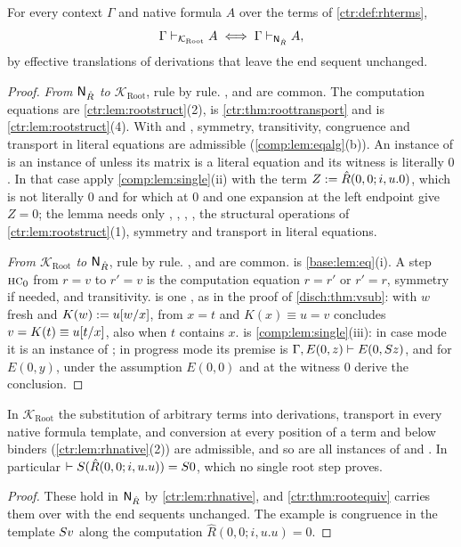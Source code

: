 \begin{theorem}\label{ctr:thm:rootequiv}
For every context $\Gamma$ and native formula $A$ over the terms of \cref{ctr:def:rhterms},
\[
 \Gamma\vdash_{\mathcal K_{\mathrm{Root}}}A\iff\Gamma\vdash_{\mathsf{N}_{\hat R}}A,
\]
by effective translations of derivations that leave the end sequent unchanged.
\end{theorem}
\begin{proof}
\emph{From $\mathsf{N}_{\hat R}$ to $\mathcal K_{\mathrm{Root}}$}, rule by rule. ,
 and  are common. The computation equations are
\cref{ctr:lem:rootstruct}(2),  is \cref{ctr:thm:roottransport} and
 is \cref{ctr:lem:rootstruct}(4). With  and ,
symmetry, transitivity, congruence and transport in literal equations are admissible
(\cref{comp:lem:eqalg}(b)). An instance of  is an instance of 
unless its matrix is a literal equation and its witness is literally $0$. In that case apply
\cref{comp:lem:single}(ii) with the term $Z\mathrel{:=}\hat R(0,0;i,u.0)$, which is not literally $0$
and for which  at $0$ and one expansion at the left endpoint give $Z=0$; the
lemma needs only , , , , the structural
operations of \cref{ctr:lem:rootstruct}(1), symmetry and transport in literal equations.

\emph{From $\mathcal K_{\mathrm{Root}}$ to $\mathsf{N}_{\hat R}$}, rule by rule. ,
 and  are common.  is \cref{base:lem:eq}(i). A step
$\rulename{HC}_0$ from $r=v$ to $r'=v$ is the computation equation $r=r'$ or $r'=r$, symmetry if
needed, and transitivity.  is one , as in the proof of
\cref{disch:thm:vsub}: with $w$ fresh and $K(w)\mathrel{:=} u[w/x]$,  from $x=t$
and $K(x)\equiv u=v$ concludes $v=K(t)\equiv u[t/x]$, also when $t$ contains $x$.
 is \cref{comp:lem:single}(iii): in case mode it is an instance of ;
in progress mode its premise is $\Gamma,E(0,z)\vdash E(0,S z)$, and  for
$E(0,y)$,  under the assumption $E(0,0)$ and  at the witness $0$
derive the conclusion.
\end{proof}

\begin{corollary}\label{ctr:cor:rootsubst}
In $\mathcal K_{\mathrm{Root}}$ the substitution of arbitrary terms into derivations, transport
in every native formula template, and conversion at every position of a term and below
binders (\cref{ctr:lem:rhnative}(2)) are admissible, and so are all instances of 
and . In particular $\vdash S(\hat R(0,0;i,u.u))=S 0$, which no single
root step proves.
\end{corollary}
\begin{proof}
These hold in $\mathsf{N}_{\hat R}$ by \cref{ctr:lem:rhnative}, and \cref{ctr:thm:rootequiv} carries
them over with the end sequents unchanged. The example is congruence in the template $S v$
along the computation $\hat R(0,0;i,u.u)=0$.
\end{proof}

